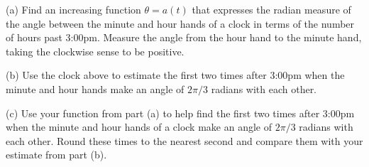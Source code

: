 \documentclass{ximera}
\begin{document}
\begin{question}   \label{Q54B: Angles}
(a) Find an increasing function $\theta = a(t)$ that expresses the radian measure of the angle between the minute and hour hands of a clock in terms of the number of hours past 3:00pm. Measure the angle from the hour hand to the minute hand, taking the clockwise sense to be positive. %

(b) Use the clock above to estimate the first two times after 3:00pm when the minute and hour hands make an angle of $2\pi/3$ radians with each other.

(c) Use your function from part (a) to help find the first two times after 3:00pm when the minute and hour hands of a clock make an angle of $2\pi/3$ radians with each other. Round these times to the nearest second and compare them with your estimate from part (b).

\end{question}
\end{document}
